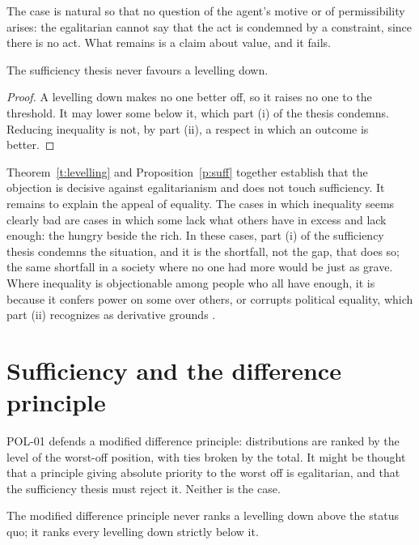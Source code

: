 \documentclass{situationist-preprint}
\begin{document}
The case is natural so that no question of the agent's motive or of permissibility arises: the egalitarian cannot say that the act is condemned by a constraint, since there is no act. What remains is a claim about value, and it fails.

\begin{proposition}\label{p:suff}
The sufficiency thesis never favours a levelling down.
\end{proposition}

\begin{proof}
A levelling down makes no one better off, so it raises no one to the threshold. It may lower some below it, which part (i) of the thesis condemns. Reducing inequality is not, by part (ii), a respect in which an outcome is better.
\end{proof}

Theorem~\ref{t:levelling} and Proposition~\ref{p:suff} together establish that the objection is decisive against egalitarianism and does not touch sufficiency. It remains to explain the appeal of equality. The cases in which inequality seems clearly bad are cases in which some lack what others have in excess and lack enough: the hungry beside the rich. In these cases, part (i) of the sufficiency thesis condemns the situation, and it is the shortfall, not the gap, that does so; the same shortfall in a society where no one had more would be just as grave. Where inequality is objectionable among people who all have enough, it is because it confers power on some over others, or corrupts political equality, which part (ii) recognizes as derivative grounds \citep{Anderson1999}.

\section{Sufficiency and the difference principle}

POL-01 defends a modified difference principle: distributions are ranked by the level of the worst-off position, with ties broken by the total. It might be thought that a principle giving absolute priority to the worst off is egalitarian, and that the sufficiency thesis must reject it. Neither is the case.

\begin{proposition}\label{p:mdp}
The modified difference principle never ranks a levelling down above the status quo; it ranks every levelling down strictly below it.
\end{proposition}
\end{document}
